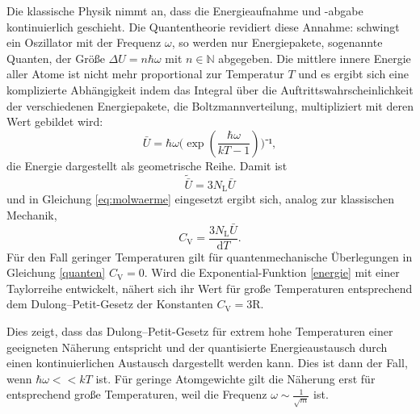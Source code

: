 Die klassische Physik nimmt an, dass die Energieaufnahme und -abgabe kontinuierlich geschieht.
Die Quantentheorie revidiert diese Annahme: 
schwingt ein Oszillator mit der Frequenz $\omega$, so werden nur Energiepakete, sogenannte Quanten, der Größe $\Delta{U}=n \hbar \omega$ mit $n\in\mathbb{N} $ abgegeben.
Die mittlere innere Energie aller Atome ist nicht mehr proportional zur Temperatur $T$ und es ergibt sich eine komplizierte Abhängigkeit indem das Integral über die Auftrittswahrscheinlichkeit der verschiedenen Energiepakete, die Boltzmannverteilung, multipliziert mit deren Wert gebildet wird:
\begin{equation}
	{\bar{U}=\hbar\omega(\exp(\frac{\hbar\omega}{kT-1})})⁻¹,
	\label{energie}
\end{equation}
die Energie dargestellt als geometrische Reihe.
Damit ist
\begin{equation}
	\tilde{{\bar{U}}}=3N_\mathup{L}\bar{U}
\end{equation}
und in Gleichung \eqref{eq:molwaerme} eingesetzt ergibt sich, analog zur klassischen Mechanik,    
\begin{equation}
	C_\mathup{V}=\frac{3N_\mathup{L}\bar{U}}{\mathup{d}T}.
	\label{quanten}
\end{equation}
Für den Fall geringer Temperaturen gilt für quantenmechanische Überlegungen in Gleichung \eqref{quanten} $C_\mathup{V}=0$. 
Wird die Exponential-Funktion \eqref{energie} mit einer Taylorreihe entwickelt, nähert sich ihr Wert für große Temperaturen entsprechend dem Dulong--Petit-Gesetz der Konstanten $C_\mathup{V}=3\text{R}$.

Dies zeigt, dass das Dulong--Petit-Gesetz für extrem hohe Temperaturen einer geeigneten Näherung entspricht und der quantisierte Energieaustausch durch einen kontinuierlichen Austausch dargestellt werden kann. 
Dies ist dann der Fall, wenn $\hbar\omega<<kT$ ist. 
Für geringe Atomgewichte gilt die Näherung erst für entsprechend große Temperaturen, weil die Frequenz $\omega\sim\frac{1}{\sqrt{m}}$ ist.


